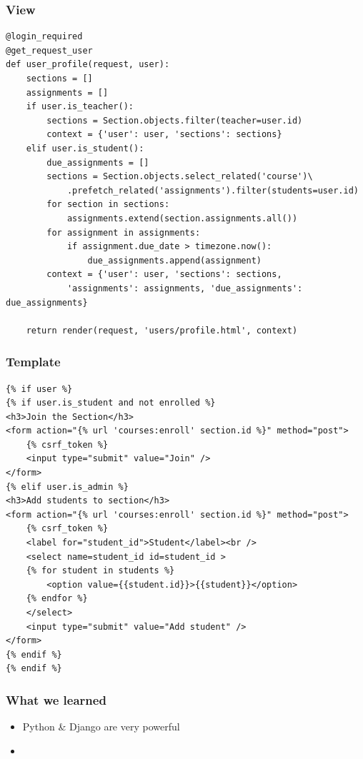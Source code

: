\documentclass{beamer}
\begin{document}
\begin{frame}[fragile]
\frametitle{View}

\begin{lstlisting}[basicstyle=\tiny]
@login_required
@get_request_user
def user_profile(request, user):
    sections = []
    assignments = []
    if user.is_teacher():
        sections = Section.objects.filter(teacher=user.id)
        context = {'user': user, 'sections': sections}
    elif user.is_student():
        due_assignments = []
        sections = Section.objects.select_related('course')\
            .prefetch_related('assignments').filter(students=user.id)
        for section in sections:
            assignments.extend(section.assignments.all())
        for assignment in assignments:
            if assignment.due_date > timezone.now():
                due_assignments.append(assignment)
        context = {'user': user, 'sections': sections, 
            'assignments': assignments, 'due_assignments': due_assignments}

    return render(request, 'users/profile.html', context)  
\end{lstlisting}
\end{frame}




\begin{frame}[fragile]
\frametitle{Template}

\begin{lstlisting}[basicstyle=\tiny]
{% if user %}
{% if user.is_student and not enrolled %}
<h3>Join the Section</h3>
<form action="{% url 'courses:enroll' section.id %}" method="post">
    {% csrf_token %}
    <input type="submit" value="Join" />
</form>
{% elif user.is_admin %}
<h3>Add students to section</h3>
<form action="{% url 'courses:enroll' section.id %}" method="post">
    {% csrf_token %}
    <label for="student_id">Student</label><br />
    <select name=student_id id=student_id >
    {% for student in students %}
        <option value={{student.id}}>{{student}}</option>
    {% endfor %}
    </select>
    <input type="submit" value="Add student" />
</form>
{% endif %}
{% endif %}  
\end{lstlisting}
\end{frame}


\begin{frame}[fragile]
\frametitle{What we learned}

\begin{itemize}
	\item Python \& Django are very powerful
	\item 
\end{itemize}

\end{frame}
\end{document}
